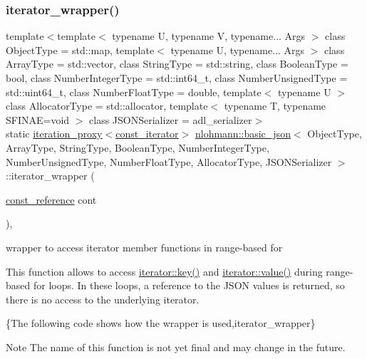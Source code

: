 \subsubsection{\texorpdfstring{iterator\+\_\+wrapper()}{iterator\_wrapper()}\hspace{0.1cm}{\footnotesize\ttfamily [2/2]}}
{\footnotesize\ttfamily template$<$template$<$ typename U, typename V, typename... Args $>$ class Object\+Type = std\+::map, template$<$ typename U, typename... Args $>$ class Array\+Type = std\+::vector, class String\+Type  = std\+::string, class Boolean\+Type  = bool, class Number\+Integer\+Type  = std\+::int64\+\_\+t, class Number\+Unsigned\+Type  = std\+::uint64\+\_\+t, class Number\+Float\+Type  = double, template$<$ typename U $>$ class Allocator\+Type = std\+::allocator, template$<$ typename T, typename S\+F\+I\+N\+A\+E=void $>$ class J\+S\+O\+N\+Serializer = adl\+\_\+serializer$>$ \\
static \mbox{\hyperlink{classnlohmann_1_1detail_1_1iteration__proxy}{iteration\+\_\+proxy}}$<$\mbox{\hyperlink{classnlohmann_1_1basic__json_a41a70cf9993951836d129bb1c2b3126a}{const\+\_\+iterator}}$>$ \mbox{\hyperlink{classnlohmann_1_1basic__json}{nlohmann\+::basic\+\_\+json}}$<$ Object\+Type, Array\+Type, String\+Type, Boolean\+Type, Number\+Integer\+Type, Number\+Unsigned\+Type, Number\+Float\+Type, Allocator\+Type, J\+S\+O\+N\+Serializer $>$\+::iterator\+\_\+wrapper (\begin{DoxyParamCaption}\item[{\mbox{\hyperlink{classnlohmann_1_1basic__json_a4057c5425f4faacfe39a8046871786ca}{const\+\_\+reference}}}]{cont }\end{DoxyParamCaption})\hspace{0.3cm}{\ttfamily [inline]}, {\ttfamily [static]}}



wrapper to access iterator member functions in range-\/based for 

This function allows to access \mbox{\hyperlink{classnlohmann_1_1detail_1_1iter__impl_a3a541a223320f6635f2f188ba54f8818}{iterator\+::key()}} and \mbox{\hyperlink{classnlohmann_1_1detail_1_1iter__impl_ab447c50354c6611fa2ae0100ac17845c}{iterator\+::value()}} during range-\/based for loops. In these loops, a reference to the J\+S\+ON values is returned, so there is no access to the underlying iterator.

\{The following code shows how the wrapper is used,iterator\+\_\+wrapper\}

\begin{DoxyNote}{Note}
The name of this function is not yet final and may change in the future. 
\end{DoxyNote}
\mbox{\label{classnlohmann_1_1basic__json_a2f47d3c6a441c57dd2be00449fbb88e1}} 
